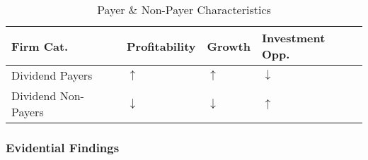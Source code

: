 \documentclass[11pt, english]{article}
\begin{document}
	\begin{table}[h]
		\scriptsize
	\begin{center}
	\begin{tabular}{p{3.5cm}p{2.5cm}p{2.5cm}p{2.5cm}}
		\textbf{Firm Cat.} & \textbf{Profitability} & \textbf{Growth} & \textbf{Investment Opp.}\\
		\hline
		Dividend Payers & $\uparrow$ & $\uparrow$ & $\downarrow$\\
		Dividend Non-Payers & $\downarrow$ & $\downarrow$ & $\uparrow$\\
		\hline
	\end{tabular}
		\caption{Payer \& Non-Payer Characteristics}
	\end{center}
	\end{table}

		\newpage

		\subsubsection*{Evidential Findings}
\end{document}
